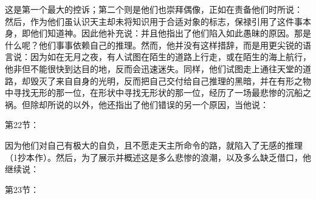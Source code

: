 这是第一个最大的控诉；第二个则是他们也崇拜偶像，正如在责备他们时所说： 然后，作为他们虽认识天主却未将知识用于合适对象的标志，保禄引用了这件事本身，即他们知道神。因此他补充说：并且他指出了他们陷入如此愚昧的原因。那是什么呢？他们事事依赖自己的推理。然而，他并没有这样措辞，而是用更尖锐的语言说：因为如在无月之夜，有人试图在陌生的道路上行走，或在陌生的海上航行，他非但不能很快到达目的地，反而会迅速迷失。同样，他们试图走上通往天堂的道路，却毁灭了来自自身的光明，反而把自己交付给自己推理的黑暗，并在有形之物中寻找无形的那一位，在形状中寻找无形状的那一位，经历了一场最悲惨的沉船之祸。但除却所说的以外，他还指出了他们错误的另一个原因，当他说：\par

第22节：\par

因为他们对自己有极大的自负，且不愿走天主所命令的路，就陷入了无感的推理（1抄本作）。然后，为了展示并概述这是多么悲惨的浪潮，以及多么缺乏借口，他继续说：\par

第23节：\par

